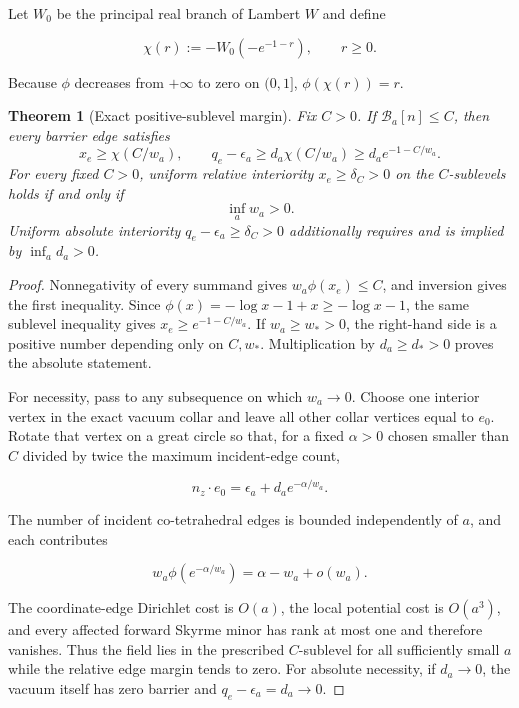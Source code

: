 \documentclass[11pt]{article}
\numberwithin{equation}{section}
\newtheorem{theorem}{Theorem}[section]
\theoremstyle{definition}
\theoremstyle{remark}
\newcommand{\cB}{\mathcal B}
\newcommand{\ezer}{e_0}
\begin{document}
Let $W_0$ be the principal real branch of Lambert $W$ and define

\begin{equation}
 \chi(r):=-W_0(-e^{-1-r}),\qquad r\ge0.
 \label{eq:chi}
\end{equation}

Because $\phi$ decreases from $+\infty$ to zero on $(0,1]$,
$\phi(\chi(r))=r$.

\begin{theorem}[Exact positive-sublevel margin]
Fix $C>0$.  If $\cB_a[n]\le C$, then every barrier edge satisfies
\begin{equation}
 x_e\ge\chi(C/w_a),\qquad
 q_e-\epsilon_a\ge d_a\chi(C/w_a)
 \ge d_a e^{-1-C/w_a}.
 \label{eq:margin}
\end{equation}
For every fixed $C>0$, uniform relative interiority
$x_e\ge\delta_C>0$ on the $C$-sublevels holds if and only if
\begin{equation}
 \inf_a w_a>0.
 \label{eq:w-condition}
\end{equation}
Uniform absolute interiority $q_e-\epsilon_a\ge\delta_C>0$ additionally
requires and is implied by $\inf_a d_a>0$.
\end{theorem}

\begin{proof}
Nonnegativity of every summand gives
$w_a\phi(x_e)\le C$, and inversion gives the first inequality.  Since
$\phi(x)=-\log x-1+x\ge-\log x-1$, the same sublevel inequality gives
$x_e\ge e^{-1-C/w_a}$.  If $w_a\ge w_*>0$, the right-hand side is a
positive number depending only on $C,w_*$.  Multiplication by
$d_a\ge d_*>0$ proves the absolute statement.

For necessity, pass to any subsequence on which $w_a\to0$.  Choose one
interior vertex in the exact
vacuum collar and leave all other collar vertices equal to $\ezer$.  Rotate
that vertex on a great circle so that, for a fixed $\alpha>0$ chosen smaller
than $C$ divided by twice the maximum incident-edge count,

\[
 n_z\cdot\ezer=\epsilon_a+d_a e^{-\alpha/w_a}.
\]

The number of incident co-tetrahedral edges is bounded independently of
$a$, and each contributes

\[
 w_a\phi(e^{-\alpha/w_a})
 =\alpha-w_a+o(w_a).
\]

The coordinate-edge Dirichlet cost is $O(a)$, the local potential cost is
$O(a^3)$, and every affected forward Skyrme minor has rank at most one and
therefore vanishes.  Thus the field lies in the prescribed $C$-sublevel for
all sufficiently small $a$ while the relative edge margin tends to zero.
For absolute necessity, if $d_a\to0$, the vacuum itself has zero barrier and
$q_e-\epsilon_a=d_a\to0$.
\end{proof}
\end{document}
